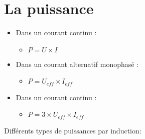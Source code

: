 \documentclass[a4paper]{article}
\begin{document}
\section{La puissance}
\begin{itemize}
    \item Dans un courant continu :
    \begin{itemize}
        \item $P = U \times I$
    \end{itemize}
    \item Dans un courant alternatif monophasé :
    \begin{itemize}
        \item $P = U_{eff} \times I_{eff}$
    \end{itemize}
    \item Dans un courant continu :
    \begin{itemize}
        \item $P = 3 \times U_{eff} \times I_{eff}$
    \end{itemize}
\end{itemize}
\vspace{0.5cm}
Différents types de puissances par induction:
\end{document}
